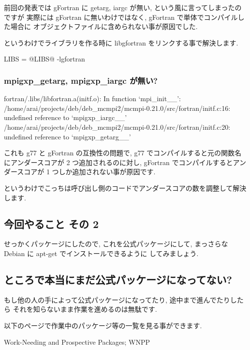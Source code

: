 \documentclass[mingoth,a4paper]{jsarticle}
\begin{document}
\begin{commandline}
前回の発表では gFortran に getarg, iargc が無い,
という風に言ってしまったのですが
実際には gFortran に無いわけではなく, gFortran で単体でコンパイルした場合に
オブジェクトファイルに含められない事が原因でした.

というわけでライブラリを作る時に libgfortran をリンクする事で解決します.

\begin{commandline}
LIBS = @LIBS@ -lgfortran
\end{commandline}

\subsubsection{mpigxp\_getarg, mpigxp\_iargc が無い?}

\begin{commandline}
fortran/.libs/libfortran.a(initf.o): In function `mpi_init__':
/home/arai/projects/deb/deb_mcmpi2/mcmpi-0.21.0/src/fortran/initf.c:16: 
 undefined reference to `mpigxp_iargc__'
/home/arai/projects/deb/deb_mcmpi2/mcmpi-0.21.0/src/fortran/initf.c:20: 
 undefined reference to `mpigxp_getarg__'
\end{commandline}

これも g77 と gFortran の互換性の問題で,
g77 でコンパイルすると元の関数名にアンダースコアが 2 つ追加されるのに対し,
gFortran でコンパイルするとアンダースコアが 1 つしか追加されない事が原因です.

というわけでこっちは呼び出し側のコードでアンダースコアの数を調整して解決します.

\subsection{今回やること その 2}

せっかくパッケージにしたので, これを公式パッケージにして,
まっさらな Debian に apt-get でインストールできるように
してみましょう.

\subsection{ところで本当にまだ公式パッケージになってない?}

もし他の人の手によって公式パッケージになってたり, 途中まで進んでたりしたら
それを知らないまま作業を進めるのは無駄です.

以下のページで作業中のパッケージ等の一覧を見る事ができます.

\begin{center}
Work-Needing and Prospective Packages; WNPP


\end{center}
\end{commandline}
\end{document}
